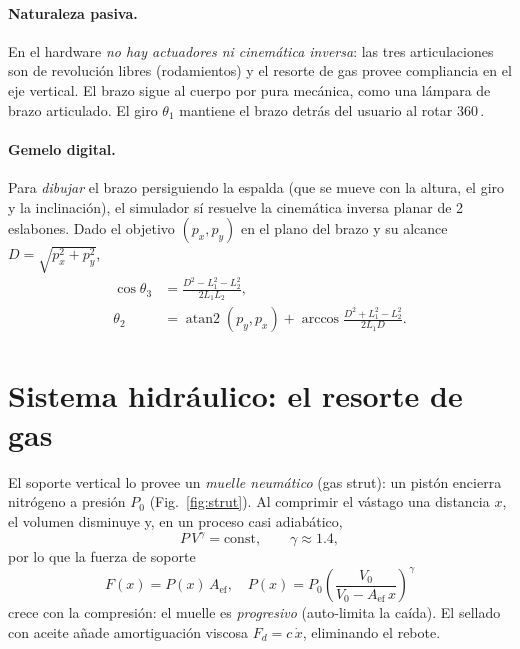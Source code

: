 \documentclass[10pt,twocolumn]{article}
\providecommand{\SI}[2]{#1\,#2}
\begin{document}
\paragraph{Naturaleza pasiva.} En el hardware \emph{no hay actuadores ni cinem\'atica
inversa}: las tres articulaciones son de revoluci\'on libres (rodamientos) y el resorte
de gas provee compliancia en el eje vertical. El brazo sigue al cuerpo por pura mec\'anica,
como una l\'ampara de brazo articulado. El giro $\theta_1$ mantiene el brazo detr\'as del
usuario al rotar \SI{360}{\degree}.

\paragraph{Gemelo digital.} Para \emph{dibujar} el brazo persiguiendo la espalda (que se
mueve con la altura, el giro y la inclinaci\'on), el simulador s\'i resuelve la cinem\'atica
inversa planar de 2 eslabones. Dado el objetivo $(p_x,p_y)$ en el plano del brazo y su
alcance $D=\sqrt{p_x^2+p_y^2}$,
\begin{align}
\cos\theta_3 &= \frac{D^2-L_1^2-L_2^2}{2L_1L_2},\\
\theta_2 &= \operatorname{atan2}(p_y,p_x) + \arccos\!\frac{D^2+L_1^2-L_2^2}{2L_1D}.
\end{align}

\section{Sistema hidr\'aulico: el resorte de gas}
El soporte vertical lo provee un \emph{muelle neum\'atico} (gas strut): un pist\'on
encierra nitr\'ogeno a presi\'on $P_0$ (Fig.~\ref{fig:strut}). Al comprimir el v\'astago
una distancia $x$, el volumen disminuye y, en un proceso casi adiab\'atico,
\begin{equation}
P\,V^{\gamma}=\text{const},\qquad \gamma\approx1.4,
\end{equation}
por lo que la fuerza de soporte
\begin{equation}
F(x)=P(x)\,A_{\text{ef}},\quad
P(x)=P_0\!\left(\frac{V_0}{V_0-A_{\text{ef}}\,x}\right)^{\!\gamma}
\end{equation}
crece con la compresi\'on: el muelle es \emph{progresivo} (auto-limita la ca\'ida). El
sellado con aceite a\~nade amortiguaci\'on viscosa $F_d=c\,\dot{x}$, eliminando el rebote.
\end{document}
